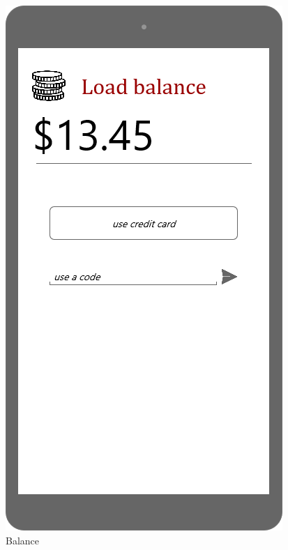\documentclass{article}
\begin{document}
\begin{figure}[H]
  \includegraphics[width=\linewidth]{06-Balance.png}
  \caption{Balance}\label{fig:MU15}
\endminipage
\end{figure}
\end{document}
